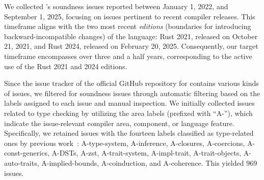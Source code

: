 We collected \rustc{}'s soundness issues reported between January 1, 2022, and
September 1, 2025, focusing on issues pertinent to recent compiler releases.
%
This timeframe aligns with the two most recent \textit{editions} (boundaries for
introducing backward-incompatible changes) of the language:
%
Rust 2021, released on October 21, 2021, and Rust 2024, released on February 20,
2025.
%
Consequently, our target timeframe encompasses over three and a half years,
corresponding to the active use of the Rust 2021 and 2024 editions.

%

Since the issue tracker of the official GitHub repository for \rustc{} contains
various kinds of issues, we filtered for soundness issues through automatic
filtering based on the labels assigned to each issue and manual inspection.
%
We initially collected issues related to type checking by utilizing the area
labels (prefixed with ``A-''), which indicate the issue-relevant compiler area,
component, or language feature.
%
Specifically, we retained issues with the fourteen labels classified as
type-related ones by previous work~\cite{liu2025empiricala}:
%
A-type-system, A-inference, A-closures, A-coercions, A-const-generics, A-DSTs,
A-zst, A-trait-system, A-impl-trait, A-trait-objects, A-auto-traits,
A-implied-bounds, A-coinduction, and A-coherence.
%
This yielded 969 issues.

%
%

